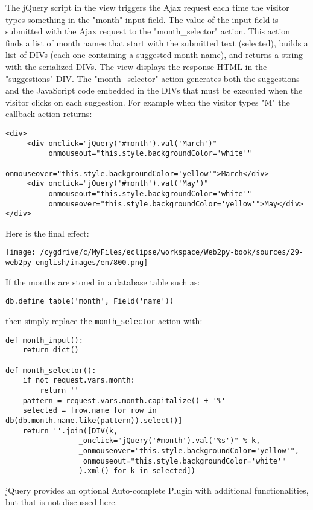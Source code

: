 \documentclass[justified,sixbynine,notoc]{tufte-book}
\def\ft{\small\tt}
\begin{document}
\begin{fullwidth}
The jQuery script in the view triggers the Ajax request each time the visitor types something in the "month" input field. The value of the input field is submitted with the Ajax request to the "month\_selector" action. This action finds a list of month names that start with the submitted text (selected), builds a list of DIVs (each one containing a suggested month name), and returns a string with the serialized DIVs. The view displays the response HTML in the "suggestions" DIV. The "month\_selector" action generates both the suggestions and the JavaScript code embedded in the DIVs that must be executed when the visitor clicks on each suggestion. For example when the visitor types "M" the callback action returns:
\begin{lstlisting}[keywords={}]
<div>
     <div onclick="jQuery('#month').val('March')"
          onmouseout="this.style.backgroundColor='white'"
          onmouseover="this.style.backgroundColor='yellow'">March</div>
     <div onclick="jQuery('#month').val('May')"
          onmouseout="this.style.backgroundColor='white'"
          onmouseover="this.style.backgroundColor='yellow'">May</div>
</div>
\end{lstlisting}

Here is the final effect:


\goodbreak\begin{center}\texttt{[image: /cygdrive/c/MyFiles/eclipse/workspace/Web2py-book/sources/29-web2py-english/images/en7800.png]}\end{center}


If the months are stored in a database table such as:
\begin{lstlisting}
db.define_table('month', Field('name'))
\end{lstlisting}
\noindent then simply replace the {\ft month\_selector} action with:
\begin{lstlisting}
def month_input():
    return dict()

def month_selector():
    if not request.vars.month:
        return ''
    pattern = request.vars.month.capitalize() + '%'
    selected = [row.name for row in db(db.month.name.like(pattern)).select()]
    return ''.join([DIV(k,
                 _onclick="jQuery('#month').val('%s')" % k,
                 _onmouseover="this.style.backgroundColor='yellow'",
                 _onmouseout="this.style.backgroundColor='white'"
                 ).xml() for k in selected])
\end{lstlisting}
\noindent jQuery provides an optional Auto-complete Plugin with additional functionalities, but that is not discussed here.


\end{fullwidth}
\end{document}
